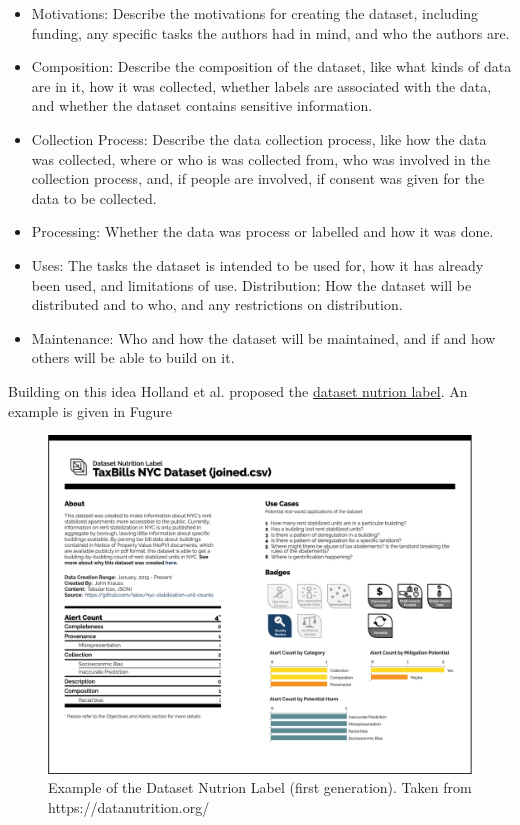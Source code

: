 \documentclass[
]{book}
\providecommand{\tightlist}{%
  \setlength{\itemsep}{0pt}\setlength{\parskip}{0pt}}
\begin{document}
\begin{itemize}
\tightlist
\item
  Motivations: Describe the motivations for creating the dataset, including funding, any specific tasks the authors had in mind, and who the authors are.
\item
  Composition: Describe the composition of the dataset, like what kinds of data are in it, how it was collected, whether labels are associated with the data, and whether the dataset contains sensitive information.
\item
  Collection Process: Describe the data collection process, like how the data was collected, where or who is was collected from, who was involved in the collection process, and, if people are involved, if consent was given for the data to be collected.
\item
  Processing: Whether the data was process or labelled and how it was done.
\item
  Uses: The tasks the dataset is intended to be used for, how it has already been used, and limitations of use.
  Distribution: How the dataset will be distributed and to who, and any restrictions on distribution.
\item
  Maintenance: Who and how the dataset will be maintained, and if and how others will be able to build on it.
\end{itemize}

Building on this idea Holland et al. \citep{Hollandetal2018DatasetNutritionLabel} proposed the \href{https://datanutrition.org/}{dataset nutrion label}. An example is given in Fugure

\begin{figure}

{\centering \includegraphics[width=1\linewidth]{images/dataset_nutrion_label} 

}

\caption{Example of the Dataset Nutrion Label (first generation). Taken from https://datanutrition.org/}\label{fig:unnamed-chunk-6}
\end{figure}
\end{document}
